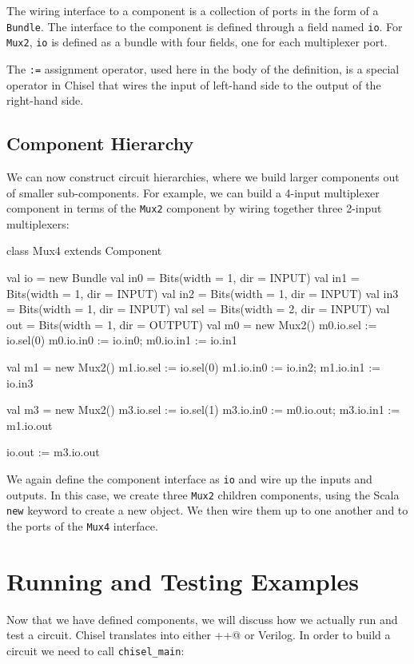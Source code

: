 \documentclass[twocolumn,10pt]{article}
\def\code#1{{\tt #1}}
\begin{document}
\noindent
The wiring interface to a component is a collection of ports in the
form of a \code{Bundle}.  The interface to the component is defined
through a field named \code{io}.  For \code{Mux2}, \code{io} is
defined as a bundle with four fields, one for each multiplexer port.

The \code{:=} assignment operator, used here in the body of the
definition, is a special operator in Chisel that wires the input of
left-hand side to the output of the right-hand side.

\subsection{Component Hierarchy}

We can now construct circuit hierarchies, where we build larger components out
of smaller sub-components.  For example, we can build a 4-input
multiplexer component in terms of the \code{Mux2} component by wiring
together three 2-input multiplexers:

\begin{scala}
class Mux4 extends Component {
  val io = new Bundle {
    val in0 = Bits(width = 1, dir = INPUT)
    val in1 = Bits(width = 1, dir = INPUT)
    val in2 = Bits(width = 1, dir = INPUT)
    val in3 = Bits(width = 1, dir = INPUT)
    val sel = Bits(width = 2, dir = INPUT)
    val out = Bits(width = 1, dir = OUTPUT)
  }
  val m0 = new Mux2()
  m0.io.sel := io.sel(0) 
  m0.io.in0 := io.in0; m0.io.in1 := io.in1

  val m1 = new Mux2()
  m1.io.sel := io.sel(0) 
  m1.io.in0 := io.in2; m1.io.in1 := io.in3

  val m3 = new Mux2()
  m3.io.sel := io.sel(1) 
  m3.io.in0 := m0.io.out; m3.io.in1 := m1.io.out

  io.out := m3.io.out
}
\end{scala}

\noindent
We again define the component interface as \code{io} and wire up the
inputs and outputs.  In this case, we create three \code{Mux2}
children components, using the Scala \code{new} keyword to create a
new object.  We then wire them up to one another and to the ports of
the \code{Mux4} interface.

\section{Running and Testing Examples}

Now that we have defined components, we will discuss how we actually run and test a circuit.  Chisel translates into either \verb@C++@ or Verilog.   In order to build a circuit we need to call \code{chisel\_main}:
\end{document}
